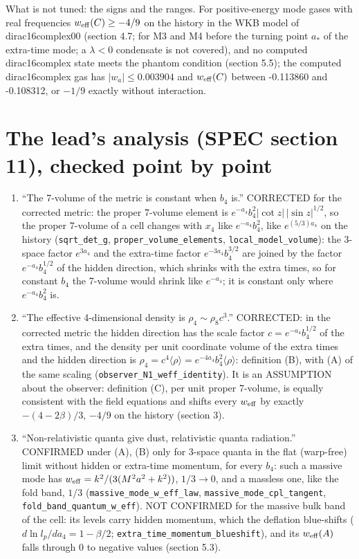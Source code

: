 \documentclass[11pt]{article}
\begin{document}
What is not tuned: the signs and the ranges. For positive-energy mode gases with real frequencies $w_{\rm eff}(C) \geq -4/9$ on the history in the WKB model of dirac16complex00 (section 4.7; for M3 and M4 before the turning point $a_*$ of the extra-time mode; a $\lambda < 0$ condensate is not covered), and no computed dirac16complex state meets the phantom condition (section 5.5); the computed dirac16complex gas has $\lvert w_a\rvert \leq 0.003904$ and $w_{\rm eff}(C)$ between -0.113860 and -0.108312, or $-1/9$ exactly without interaction.

\section{The lead's analysis (SPEC section 11), checked point by point}

\begin{enumerate}
\item ``The 7-volume of the metric is constant when $b_4$ is.'' CORRECTED for the corrected metric: the proper 7-volume element is $e^{-a_4}b_4^2\lvert\cot z\rvert\,\lvert\sin z\rvert^{1/2}$, so the proper 7-volume of a cell changes with $x_4$ like $e^{-a_4}b_4^2$, like $e^{(5/3)a_4}$ on the history (\texttt{sqrt\_det\allowbreak{}\_g}, \texttt{proper\_v\allowbreak{}olume\_el\allowbreak{}ements}, \texttt{local\_mo\allowbreak{}del\_volu\allowbreak{}me}): the 3-space factor $e^{3a_4}$ and the extra-time factor $e^{-3a_4}b_4^{3/2}$ are joined by the factor $e^{-a_4}b_4^{1/2}$ of the hidden direction, which shrinks with the extra times, so for constant $b_4$ the 7-volume would shrink like $e^{-a_4}$; it is constant only where $e^{-a_4}b_4^2$ is.
\item ``The effective 4-dimensional density is $\rho_4 \sim \rho_8c^3$.'' CORRECTED: in the corrected metric the hidden direction has the scale factor $c = e^{-a_4}b_4^{1/2}$ of the extra times, and the density per unit coordinate volume of the extra times and the hidden direction is $\rho_4 = c^4\langle\rho\rangle = e^{-4a_4}b_4^2\langle\rho\rangle$: definition (B), with (A) of the same scaling (\texttt{observer\allowbreak{}\_N1\_weff\allowbreak{}\_identit\allowbreak{}y}). It is an ASSUMPTION about the observer: definition (C), per unit proper 7-volume, is equally consistent with the field equations and shifts every $w_{\rm eff}$ by exactly $-(4 - 2\beta)/3$, $-4/9$ on the history (section 3).
\item ``Non-relativistic quanta give dust, relativistic quanta radiation.'' CONFIRMED under (A), (B) only for 3-space quanta in the flat (warp-free) limit without hidden or extra-time momentum, for every $b_4$: such a massive mode has $w_{\rm eff} = k^2/(3(M^2a^2 + k^2))$, $1/3 \to 0$, and a massless one, like the fold band, $1/3$ (\texttt{massive\_\allowbreak{}mode\_w\_e\allowbreak{}ff\_law}, \texttt{massive\_\allowbreak{}mode\_cpl\allowbreak{}\_tangent}, \texttt{fold\_ban\allowbreak{}d\_quantu\allowbreak{}m\_w\_eff}). NOT CONFIRMED for the massive bulk band of the cell: its levels carry hidden momentum, which the deflation blue-shifts ($d\ln l_p/da_4 = 1 - \beta/2$; \texttt{extra\_ti\allowbreak{}me\_momen\allowbreak{}tum\_blue\allowbreak{}shift}), and its $w_{\rm eff}(A)$ falls through 0 to negative values (section 5.3).

\end{enumerate}
\end{document}
